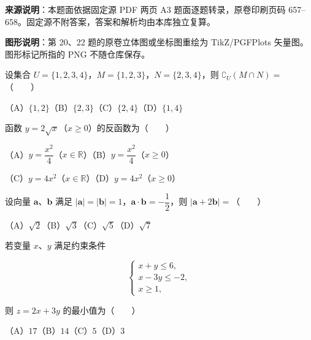 


\begin{gktip}
\textbf{来源说明}：本题面依据固定源 PDF 两页 A3 题面逐题转录，原卷印刷页码 657–658。固定源不附答案，答案和解析均由本库独立复算。

\textbf{图形说明}：第 20、22 题的原卷立体图或坐标图重绘为 TikZ/PGFPlots 矢量图。图形标记所指的 PNG 不随仓库保存。
\end{gktip}


\begin{question}
设集合 $U=\{1,2,3,4\}$，$M=\{1,2,3\}$，$N=\{2,3,4\}$，则 $\complement_U(M\cap N)=$\mbox{（　　）}

（A）$\{1,2\}$\quad（B）$\{2,3\}$\quad（C）$\{2,4\}$\quad（D）$\{1,4\}$

\end{question}
\begin{question}
函数 $y=2\sqrt{x}$（$x\geq0$）的反函数为\mbox{（　　）}

（A）$y=\dfrac{x^2}{4}$（$x\in\mathbb R$）\quad（B）$y=\dfrac{x^2}{4}$（$x\geq0$）

（C）$y=4x^2$（$x\in\mathbb R$）\quad（D）$y=4x^2$（$x\geq0$）

\end{question}
\begin{question}
设向量 $\boldsymbol a\text{、}\boldsymbol b$ 满足 $|\boldsymbol a|=|\boldsymbol b|=1$，$\boldsymbol a\cdot\boldsymbol b=-\dfrac12$，则 $|\boldsymbol a+2\boldsymbol b|=$\mbox{（　　）}

（A）$\sqrt2$\quad（B）$\sqrt3$\quad（C）$\sqrt5$\quad（D）$\sqrt7$

\end{question}
\begin{question}
若变量 $x\text{、}y$ 满足约束条件

\nopagebreak[4]
\[
\begin{cases}
x+y\leq6,\\
x-3y\leq-2,\\
x\geq1,
\end{cases}
\]

则 $z=2x+3y$ 的最小值为\mbox{（　　）}

（A）$17$\quad（B）$14$\quad（C）$5$\quad（D）$3$

\end{question}
